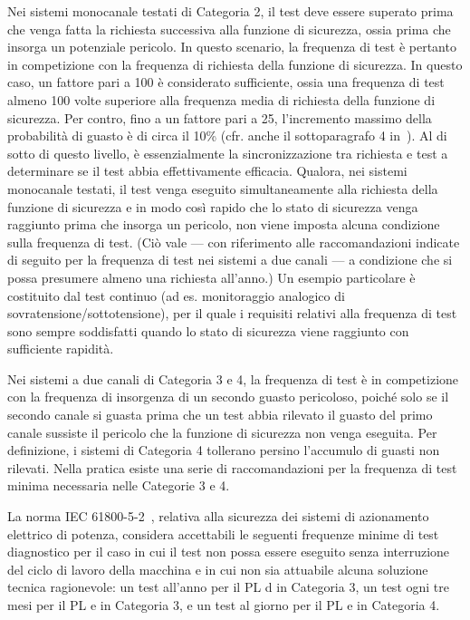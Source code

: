 Nei sistemi monocanale testati di Categoria 2, il test deve essere superato prima che venga fatta la richiesta successiva alla funzione di sicurezza, ossia prima che insorga un potenziale pericolo. In questo scenario, la frequenza di test è pertanto in competizione con la frequenza di richiesta della funzione di sicurezza. In questo caso, un fattore pari a 100 è considerato sufficiente, ossia una frequenza di test almeno 100 volte superiore alla frequenza media di richiesta della funzione di sicurezza. Per contro, fino a un fattore pari a 25, l'incremento massimo della probabilità di guasto è di circa il 10\% (cfr. anche il sottoparagrafo 4 in~\cite{cookbook4}). Al di sotto di questo livello, è essenzialmente la sincronizzazione tra richiesta e test a determinare se il test abbia effettivamente efficacia. Qualora, nei sistemi monocanale testati, il test venga eseguito simultaneamente alla richiesta della funzione di sicurezza e in modo così rapido che lo stato di sicurezza venga raggiunto prima che insorga un pericolo, non viene imposta alcuna condizione sulla frequenza di test. (Ciò vale — con riferimento alle raccomandazioni indicate di seguito per la frequenza di test nei sistemi a due canali — a condizione che si possa presumere almeno una richiesta all'anno.) Un esempio particolare è costituito dal test continuo (ad es. monitoraggio analogico di sovratensione/sottotensione), per il quale i requisiti relativi alla frequenza di test sono sempre soddisfatti quando lo stato di sicurezza viene raggiunto con sufficiente rapidità.

Nei sistemi a due canali di Categoria 3 e 4, la frequenza di test è in competizione con la frequenza di insorgenza di un secondo guasto pericoloso, poiché solo se il secondo canale si guasta prima che un test abbia rilevato il guasto del primo canale sussiste il pericolo che la funzione di sicurezza non venga eseguita. Per definizione, i sistemi di Categoria 4 tollerano persino l'accumulo di guasti non rilevati. Nella pratica esiste una serie di raccomandazioni per la frequenza di test minima necessaria nelle Categorie 3 e 4.

La norma IEC 61800-5-2~\cite{iec61800-5-2}, relativa alla sicurezza dei sistemi di azionamento elettrico di potenza, considera accettabili le seguenti frequenze minime di test diagnostico per il caso in cui il test non possa essere eseguito senza interruzione del ciclo di lavoro della macchina e in cui non sia attuabile alcuna soluzione tecnica ragionevole: un test all'anno per il PL d in Categoria 3, un test ogni tre mesi per il PL e in Categoria 3, e un test al giorno per il PL e in Categoria 4.


